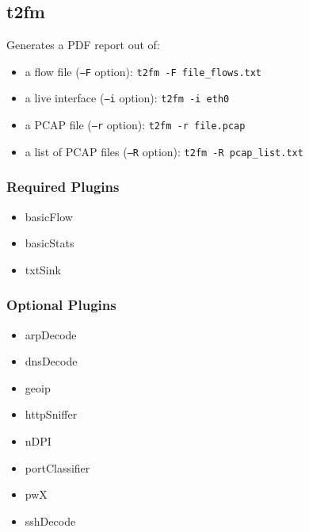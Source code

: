 \documentclass[documentation]{subfiles}
\begin{document}
\subsection{t2fm}\label{t2fm}
Generates a PDF report out of:
\begin{itemize}
    \item a flow file ({\tt --F} option): {\tt t2fm -F file\_flows.txt}
    \item a live interface ({\tt --i} option): {\tt t2fm -i eth0}
    \item a PCAP file ({\tt --r} option): {\tt t2fm -r file.pcap}
    \item a list of PCAP files ({\tt --R} option): {\tt t2fm -R pcap\_list.txt}
\end{itemize}


\subsubsection{Required Plugins}
    \begin{multicols}{4}
        \begin{itemize}
            \item basicFlow
            \item basicStats
            \item txtSink
        \end{itemize}
    \end{multicols}

\subsubsection{Optional Plugins}
    \begin{multicols}{4}
        \begin{itemize}
            \item arpDecode
            \item dnsDecode
            \item geoip
            \item httpSniffer
            \item nDPI
            \item portClassifier
            \item pwX
            \item sshDecode
        \end{itemize}
    \end{multicols}
\end{document}
